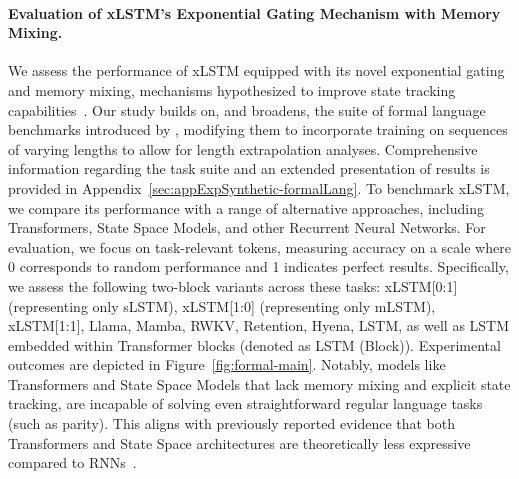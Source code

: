 \paragraph{Evaluation of xLSTM's Exponential Gating Mechanism with Memory Mixing.} We assess the performance of xLSTM equipped with its novel exponential gating and memory mixing, mechanisms hypothesized to improve state tracking capabilities~\citep{Merrill:24, Merrill:23}. Our study builds on, and broadens, the suite of formal language benchmarks introduced by \citet{Deletang:23}, modifying them to incorporate training on sequences of varying lengths to allow for length extrapolation analyses. Comprehensive information regarding the task suite and an extended presentation of results is provided in Appendix~\ref{sec:appExpSynthetic-formalLang}. 
To benchmark xLSTM, we compare its performance with a range of alternative approaches, including Transformers, State Space Models, and other Recurrent Neural Networks. For evaluation, we focus on task-relevant tokens, measuring accuracy on a scale where 0 corresponds to random performance and 1 indicates perfect results. Specifically, we assess the following two-block variants across these tasks: xLSTM[0:1] (representing only sLSTM), xLSTM[1:0] (representing only mLSTM), xLSTM[1:1], Llama, Mamba, RWKV, Retention, Hyena, LSTM, as well as LSTM embedded within Transformer blocks (denoted as LSTM (Block)). Experimental outcomes are depicted in Figure~\ref{fig:formal-main}. 
Notably, models like Transformers and State Space Models that lack memory mixing and explicit state tracking, are incapable of solving even straightforward regular language tasks (such as parity). This aligns with previously reported evidence that both Transformers and State Space architectures are theoretically less expressive compared to RNNs~\citep{Merrill:24, Merrill:23, Deletang:23}.

